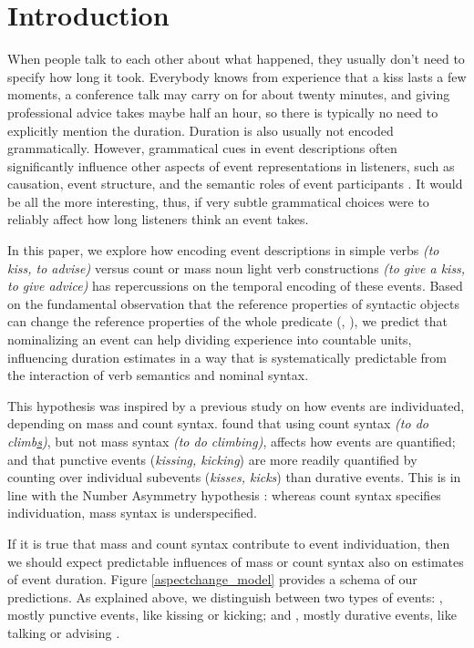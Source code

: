 \documentclass[preprint,12pt,authoryear]{elsarticle}
\begin{document}
\section{Introduction}
When people talk to each other about what happened, they usually don't need to specify how long it took. Everybody knows from experience that a kiss lasts a few moments, a conference talk may carry on for about twenty minutes, and giving professional advice takes maybe half an hour, so there is typically no need to explicitly mention the duration. Duration is also usually not encoded grammatically. However, grammatical cues in event descriptions often significantly influence other aspects of event representations in listeners, such as causation, event structure, and the semantic roles of event participants \citep{fausey2010, wittenberg2014sorting,JohnsonGoldberg2013}. It would be all the more interesting, thus, if very subtle grammatical choices were to reliably affect how long listeners think an event takes. 

In this paper, we explore how encoding event descriptions in simple verbs \emph{(to kiss, to advise)} versus count or mass noun light verb constructions \emph{(to give a kiss, to give advice)} has repercussions on the temporal encoding of these events. Based on the fundamental observation that the reference properties of syntactic objects can change the reference properties of the whole predicate (\citeauthor{Krifka1992}, \citeyear{Krifka1992}), we predict that nominalizing an event can help dividing experience into countable units, influencing duration estimates in a way that is systematically predictable from the interaction of verb semantics and nominal syntax.

This hypothesis was inspired by a previous study on how events are individuated, depending on mass and count syntax. \citet{barner2008events} found that using count syntax \emph{(to do climb\underline{s})}, but not mass syntax \emph{(to do climbing)}, affects how events are quantified; and that punctive events (\emph{kissing, kicking}) are more readily quantified by counting over individual subevents (\emph{kisses, kicks}) than durative events. This is in line with the Number Asymmetry hypothesis \citep{Barner2006}: whereas count syntax specifies individuation, mass syntax is underspecified. 

If it is true that mass and count syntax contribute to event individuation, then we should expect predictable influences of mass or count syntax also on estimates of event duration. Figure \ref{aspectchange_model} provides a schema of our predictions. As explained above, we distinguish between two types of events: {}, mostly punctive events, like kissing or kicking; and {}, mostly durative events, like talking or advising \citep[ see Footnote \ref{aspectualdistinction}]{Dowty1991,Vendler1957}. 
\end{document}

